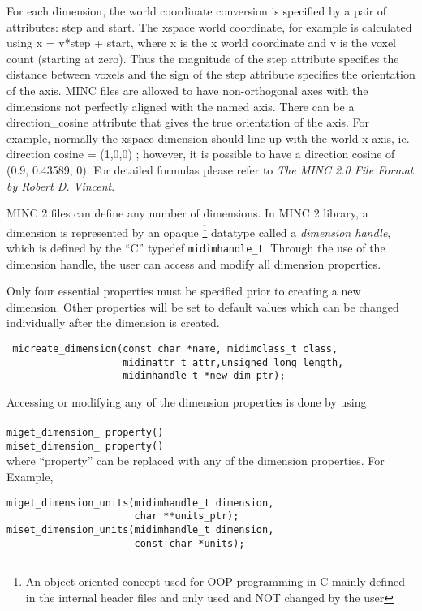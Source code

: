 \documentclass{article}
\begin{document}
For each dimension, the world  coordinate  conversion is specified  
by a pair of attributes: step and start. The xspace world coordinate, 
for example is calculated using x = v*step + start, where x is the x world 
coordinate and v is the voxel count (starting at zero). Thus the magnitude 
of the step attribute specifies the distance between voxels and the sign 
of the step attribute specifies the orientation of the axis. MINC files are 
allowed to have non-orthogonal axes with the dimensions not perfectly 
aligned with the named axis. There can be a direction\_cosine attribute that 
gives the true orientation of the axis. For example, normally the xspace 
dimension should line up with the world x axis, ie. direction cosine = (1,0,0)
; however, it is possible to have a direction cosine of (0.9, 0.43589, 0).
For detailed formulas please refer to \emph{The MINC 2.0 File Format by Robert D. 
Vincent}.

MINC 2 files can define any number of dimensions. In MINC 2 library, a dimension 
is represented by an opaque \footnote {An object oriented
concept used for OOP programming in C mainly defined in the internal header files and only 
used and NOT changed by the user} datatype
called a \emph{dimension handle}, which is defined by the ``C'' typedef
{\tt midimhandle\_t}. Through the use of the dimension handle, the user can access and 
modify all dimension properties. 

Only four essential properties must be specified prior to creating a new dimension. 
Other properties will be set to default values which can be 
changed individually after the dimension is created.
\begin{verbatim}
 micreate_dimension(const char *name, midimclass_t class, 
                    midimattr_t attr,unsigned long length, 
                    midimhandle_t *new_dim_ptr);
\end{verbatim}
Accessing or modifying any of the dimension properties is done by using \\
\\
{\tt miget\_dimension\_ property() }\\
{\tt miset\_dimension\_ property() } 
\\
where ``property'' can be replaced with any of the dimension properties. 
For Example,

\begin{verbatim}
miget_dimension_units(midimhandle_t dimension, 
                      char **units_ptr);
miset_dimension_units(midimhandle_t dimension, 
                      const char *units);
\end{verbatim}
\end{document}
